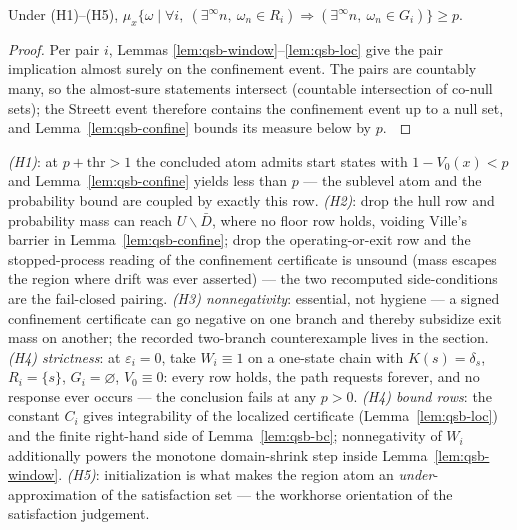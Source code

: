 \begin{bthm}\label{thm:qsb-sound}
Under (H1)--(H5),
$\mu_x\{\omega \mid \forall i,\ (\exists^\infty n,\ \omega_n \in R_i)
\Rightarrow (\exists^\infty n,\ \omega_n \in G_i)\} \ge p$.
\end{bthm}
\begin{proof}
Per pair $i$, Lemmas \ref{lem:qsb-window}--\ref{lem:qsb-loc} give the pair
implication almost surely on the confinement event. The pairs are
countably many, so the almost-sure statements intersect (countable
intersection of co-null sets); the Streett event therefore contains the
confinement event up to a null set, and Lemma~\ref{lem:qsb-confine} bounds
its measure below by $p$. $\qedhere$
\end{proof}

\begin{bremark}\label{rem:qsb-hyp}
\emph{(H1)}: at $p + \mathrm{thr} > 1$ the concluded atom admits start
states with $1 - V_0(x) < p$ and Lemma~\ref{lem:qsb-confine} yields less
than $p$ --- the sublevel atom and the probability bound are coupled by
exactly this row. \emph{(H2)}: drop the hull row and probability mass can
reach $U \smallsetminus \bar{D}$, where no floor row holds, voiding
Ville's barrier in Lemma~\ref{lem:qsb-confine}; drop the
operating-or-exit row and the stopped-process reading of the confinement
certificate is unsound (mass escapes the region where drift was ever
asserted) --- the two recomputed side-conditions are the fail-closed
pairing. \emph{(H3) nonnegativity}: essential, not hygiene --- a signed
confinement certificate can go negative on one branch and thereby
subsidize exit mass on another; the recorded two-branch counterexample
lives in the  section. \emph{(H4) strictness}:
at $\varepsilon_i = 0$, take $W_i \equiv 1$ on a one-state chain with
$K(s) = \delta_s$, $R_i = \{s\}$, $G_i = \varnothing$, $V_0 \equiv 0$:
every row holds, the path requests forever, and no response ever occurs
--- the conclusion fails at any $p > 0$. \emph{(H4) bound rows}: the
constant $C_i$ gives integrability of the localized certificate
(Lemma~\ref{lem:qsb-loc}) and the finite right-hand side of
Lemma~\ref{lem:qsb-bc}; nonnegativity of $W_i$ additionally powers the
monotone domain-shrink step inside Lemma~\ref{lem:qsb-window}.
\emph{(H5)}: initialization is what makes the region atom an
\emph{under}-approximation of the satisfaction set --- the workhorse
orientation of the satisfaction judgement.
\end{bremark}

